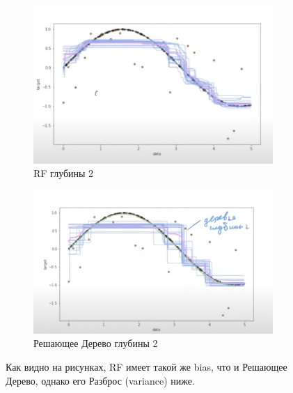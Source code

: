         \newpage
        \begin{figure}
        \begin{subfigure}{0.5\textwidth} %
            \centering
            \includegraphics[width=1\linewidth]{images/10lecture/bvd-bagging-d2.png} %
            \caption{RF глубины 2}
        \end{subfigure}%
        \begin{subfigure}{0.5\textwidth} %
            \centering
            \includegraphics[width=1\linewidth]{images/9lecture/ex2.png} %
            \caption{Решающее Дерево глубины 2}

        \end{subfigure}
        \caption{Как видно на рисунках, RF имеет такой же bias, что и Решающее Дерево, однако его Разброс (variance) ниже.}
    \end{figure}


